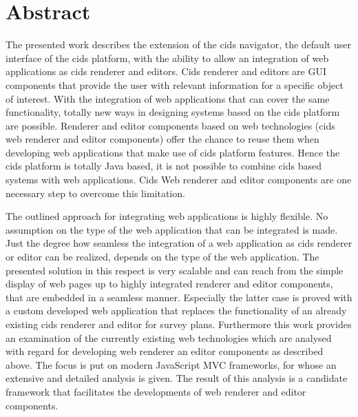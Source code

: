 \chapter*{Abstract}

The presented work describes the extension of the cids navigator, the default user interface of the cids platform, with the ability to allow an integration of web applications as cids renderer and editors. 
Cids renderer and editors are GUI components that provide the user with relevant information for a specific object of interest. 
With the integration of web applications that can cover the same functionality, totally new ways in designing systems based on the cids platform are possible. 
Renderer and editor components based on web technologies (cids web renderer and editor components) offer the chance to reuse them when developing web applications that make use of cids platform features. 
Hence the cids platform is totally Java based, it is not possible to combine cids based systems with web applications. 
Cids Web renderer and editor components are one necessary step to overcome this limitation.

The outlined approach for integrating web applications is highly flexible. 
No assumption on the type of the web application that can be integrated is made. 
Just the degree how seamless the integration of a web application as cids renderer or editor can be realized, depends on the type of the web application. 
The presented solution in this respect is very scalable and can reach from the simple display of web pages up to highly integrated renderer and editor components, that are embedded in a seamless manner. 
Especially the latter case is proved with a custom developed web application that replaces the functionality of an already existing cids renderer and editor for survey plans.
Furthermore this work provides an examination of the currently existing web technologies which are analysed with regard for developing web renderer an editor components as described above. 
The focus is put on modern JavaScript MVC frameworks, for whose an extensive and detailed analysis is given. 
The result of this analysis is a candidate framework that facilitates the developments of web renderer and editor components.

